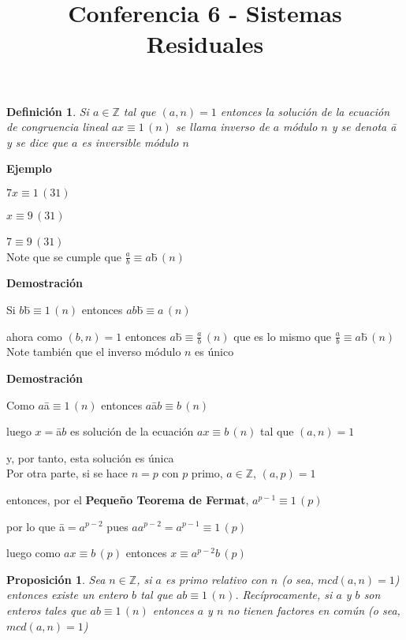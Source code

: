 \documentclass[a4paper,12pt]{report}
\title{Conferencia 6 - Sistemas Residuales}
\author{}
\newtheorem*{dfn}{Definición}
\newtheorem*{pro}{Proposición}
\begin{document}
\maketitle



\begin{dfn}
 Si $a\in\mathbb{Z}$ tal que $(a,n)=1$ entonces la solución de la ecuación de congruencia lineal $ax\equiv 1 \, (n)$ se llama inverso de $a$ módulo $n$ y se denota  \={a}  y se dice que $a$ es inversible módulo $n$
\end{dfn}

\textbf{Ejemplo}

$7x\equiv 1\, (31)$

$x\equiv 9\, (31)$

\={7}$\equiv 9\, (31)$\\



Note que se cumple que $\frac{a}{b}\equiv a$\={b}$\, (n)$

\textbf{Demostración}

Si $b$\={b}$\equiv 1 \, (n)$ entonces $ab$\={b}$\equiv a \, (n)$

ahora como $(b,n)=1$ entonces $a$\={b}$\equiv \frac{a}{b} \, (n)$ que es lo mismo que $\frac{a}{b}\equiv a$\={b}$  \, (n)$\\


Note también que el inverso módulo $n$ es único 

\textbf{Demostración}

Como $a$\={a}$\equiv 1 \, (n)$  entonces  $a$\={a}$b\equiv b \, (n)$

luego $x=$\={a}$b$ es solución de la ecuación $ax\equiv b \, (n)$ tal que $(a,n)=1$ 

y, por tanto, esta solución es única\\

Por otra parte, si se hace $n=p$ con $p$ primo, $a\in\mathbb{Z}$, $(a,p)=1$

entonces, por el \textbf{Pequeño Teorema de Fermat}, $a^{p-1}\equiv 1 \, (p)$

por lo que \={a}$=a^{p-2}$ pues $aa^{p-2}=a^{p-1}\equiv 1 \, (p)$ 

luego como $ax\equiv b \, (p)$ entonces $x\equiv a^{p-2}b \, (p)$

 \begin{pro}
  Sea $n\in \mathbb{Z}$, si $a$ es primo relativo con $n$ (o sea, $mcd(a,n)=1$) entonces existe un entero $b$ tal que $ab \equiv 1\, (n)$.
  Recíprocamente, si $a$ y $b$ son enteros tales que $ab \equiv 1 \, (n)$ entonces $a$ y $n$ no tienen factores en común (o sea, $mcd(a,n)=1$)
 \end{pro}
 
\end{document}

